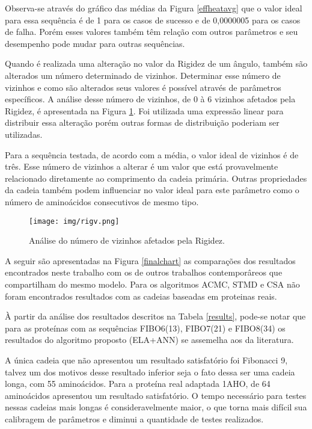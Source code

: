\documentclass[dm,ppgcomp]{texfurg}
\begin{document}
Observa-se através do gráfico das médias da Figura \ref{effheatavg} que o valor ideal para essa sequência é de 1 para os casos de sucesso e de 0,0000005 para os casos de falha. Porém esses valores também têm relação com outros parâmetros e seu desempenho pode mudar para outras sequências.

Quando é realizada uma alteração no valor da Rigidez de um ângulo, também são alterados um número determinado de vizinhos. Determinar esse número de vizinhos e como são alterados seus valores é possível através de parâmetros específicos. A análise desse número de vizinhos, de 0 à 6 vizinhos afetados pela Rigidez, é apresentada na Figura \ref{rigv}. Foi utilizada uma expressão linear para distribuir essa alteração porém outras formas de distribuição poderiam ser utilizadas. 

Para a sequência testada, de acordo com a média, o valor ideal de vizinhos é de três. Esse número de vizinhos a alterar é um valor que está provavelmente relacionado diretamente ao comprimento da cadeia primária. Outras propriedades da cadeia também podem influenciar no valor ideal para este parâmetro como o número de aminoácidos consecutivos de mesmo tipo. 

\begin{figure}[htbp]
  \centering \texttt{[image: img/rigv.png]}
\caption{Análise do número de vizinhos afetados pela Rigidez.} 
\label{rigv}
\end{figure}

A seguir são apresentadas na Figura \ref{finalchart} as comparações dos resultados encontrados neste trabalho com os de outros trabalhos contemporâreos que compartilham do mesmo modelo. Para os algoritmos ACMC, STMD e CSA não foram encontrados resultados com as cadeias baseadas em proteinas reais. 

À partir da análise dos resultados descritos na Tabela \ref{results}, pode-se notar que para as proteínas com as sequências FIBO6(13), FIBO7(21) e FIBO8(34) os resultados do algoritmo proposto (ELA+ANN) se assemelha aos da literatura.

A única cadeia que não apresentou um resultado satisfatório foi Fibonacci 9, talvez um dos motivos desse resultado inferior seja o fato dessa ser uma cadeia longa, com 55 aminoácidos. Para a proteína real adaptada 1AHO, de 64 aminoácidos apresentou um resultado satisfatório. O tempo necessário para testes nessas cadeias mais longas é consideravelmente maior, o que torna mais difícil sua calibragem de parâmetros e diminui a quantidade de testes realizados.
\end{document}
